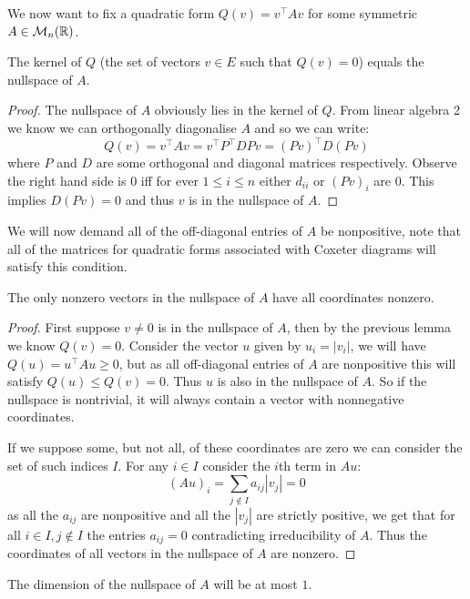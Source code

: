 \documentclass[../main.tex]{subfiles}
\begin{document}
We now want to fix a quadratic form $Q(v) = v^\top A v$ for some symmetric $A\in\mathcal{M}_n(\mathbb{R})$.

\begin{lemma}
    The kernel of $Q$ (the set of vectors $v\in E$ such that $Q(v)=0$) equals the nullspace of $A$.
    \begin{proof}
        The nullspace of $A$ obviously lies in the kernel of $Q$. From linear algebra 2 we know we can orthogonally diagonalise $A$ and so we can write: \[
            Q(v) = v^\top A v = v^\top P^\top D P v = (P v)^\top D (P v)
        \] where $P$ and $D$ are some orthogonal and diagonal matrices respectively. Observe the right hand side is $0$ iff for ever $1\leq i \leq n$ either $d_{ii}$ or $(P v)_i$ are $0$. This implies $D (P v)=0$ and thus $v$ is in the nullspace of $A$.
    \end{proof}
\end{lemma}

We will now demand all of the off-diagonal entries of $A$ be nonpositive, note that all of the matrices for quadratic forms associated with Coxeter diagrams will satisfy this condition.

\begin{lemma}
    The only nonzero vectors in the nullspace of $A$ have all coordinates nonzero.
    \begin{proof}
        First suppose $v\neq 0$ is in the nullspace of $A$, then by the previous lemma we know $Q(v)=0$. Consider the vector $u$ given by $u_i = |v_i|$, we will have $Q(u) = u^\top A u \geq 0$, but as all off-diagonal entries of $A$ are nonpositive this will satisfy $Q(u)\leq Q(v) = 0$. Thus $u$ is also in the nullspace of $A$. So if the nullspace is nontrivial, it will always contain a vector with nonnegative coordinates. 

        If we suppose some, but not all, of these coordinates are zero we can consider the set of such indices $I$. For any $i\in I$ consider the $i$th term in $Au$:\[
            (Au)_i = \sum_{j\notin I}a_{ij} |v_j| = 0
        \] as all the $a_{ij}$ are nonpositive and all the $|v_j|$ are strictly positive, we get that for all $i\in I, j\notin I$ the entries $a_{ij}=0$ contradicting irreducibility of $A$. Thus the coordinates of all vectors in the nullspace of $A$ are nonzero.
    \end{proof}
\end{lemma}

\begin{corollary}
    The dimension of the nullspace of $A$ will be at most $1$.
\end{corollary}
\end{document}

